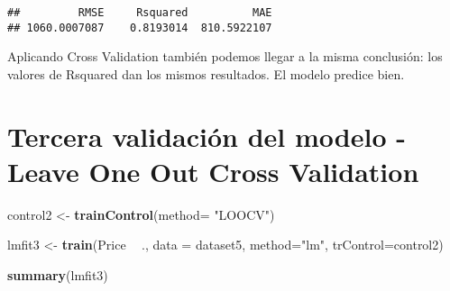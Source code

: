 \documentclass[
]{article}
\newenvironment{Shaded}{\begin{snugshade}}{\end{snugshade}}
\newcommand{\DataTypeTok}[1]{\textcolor[rgb]{0.13,0.29,0.53}{#1}}
\newcommand{\DecValTok}[1]{\textcolor[rgb]{0.00,0.00,0.81}{#1}}
\newcommand{\KeywordTok}[1]{\textcolor[rgb]{0.13,0.29,0.53}{\textbf{#1}}}
\newcommand{\NormalTok}[1]{#1}
\newcommand{\OperatorTok}[1]{\textcolor[rgb]{0.81,0.36,0.00}{\textbf{#1}}}
\newcommand{\StringTok}[1]{\textcolor[rgb]{0.31,0.60,0.02}{#1}}
\begin{document}
\begin{Shaded}
\end{Shaded}

\begin{verbatim}
##         RMSE     Rsquared          MAE 
## 1060.0007087    0.8193014  810.5922107
\end{verbatim}

Aplicando Cross Validation también podemos llegar a la misma conclusión:
los valores de Rsquared dan los mismos resultados. El modelo predice
bien.

\hypertarget{tercera-validaciuxf3n-del-modelo---leave-one-out-cross-validation}{%
\section{Tercera validación del modelo - Leave One Out Cross
Validation}\label{tercera-validaciuxf3n-del-modelo---leave-one-out-cross-validation}}

\begin{Shaded}
\begin{Highlighting}[]
\NormalTok{control2 <-}\StringTok{ }\KeywordTok{trainControl}\NormalTok{(}\DataTypeTok{method=} \StringTok{"LOOCV"}\NormalTok{)}

\NormalTok{lmfit3 <-}\StringTok{ }\KeywordTok{train}\NormalTok{(Price }\OperatorTok{~}\StringTok{ }\NormalTok{., }\DataTypeTok{data =}\NormalTok{ dataset5, }\DataTypeTok{method=}\StringTok{"lm"}\NormalTok{, }\DataTypeTok{trControl=}\NormalTok{control2)}

\KeywordTok{summary}\NormalTok{(lmfit3)}
\end{Highlighting}
\end{Shaded}
\end{document}
